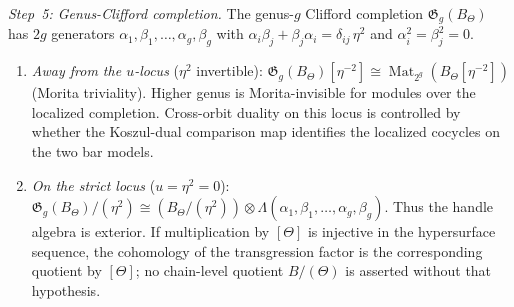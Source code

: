 \begin{construction}
\emph{Step~5: Genus-Clifford completion.}
The genus-$g$ Clifford completion
\(\mathfrak G_g(B_\Theta)\) has \(2g\) generators
$\alpha_1,\beta_1,\dots,\alpha_g,\beta_g$ with
$\alpha_i\beta_j+\beta_j\alpha_i=\delta_{ij}\,\eta^2$ and
$\alpha_i^2=\beta_j^2=0$.

\begin{enumerate}[label=\textup{(\roman*)}]
\item \emph{Away from the $u$-locus} ($\eta^2$ invertible):
 $\mathfrak G_g(B_\Theta)[\eta^{-2}]
 \cong\operatorname{Mat}_{2^g}(B_\Theta[\eta^{-2}])$
 (Morita triviality).
 Higher genus is Morita-invisible for modules over the localized
 completion. Cross-orbit duality on this locus is controlled by
 whether the Koszul-dual comparison map identifies the localized
 cocycles on the two bar models.

\item \emph{On the strict locus} ($u=\eta^2=0$):
 $\mathfrak G_g(B_\Theta)/(\eta^2)
 \cong (B_\Theta/(\eta^2))\otimes
 \Lambda(\alpha_1,\beta_1,\dots,\alpha_g,\beta_g)$.
 Thus the handle algebra is exterior.  If multiplication by
 \([\Theta]\) is injective in the hypersurface sequence, the cohomology
 of the transgression factor is the corresponding quotient by
 \([\Theta]\); no chain-level quotient \(B/(\Theta)\) is asserted
 without that hypothesis.
\end{enumerate}
\end{construction}

